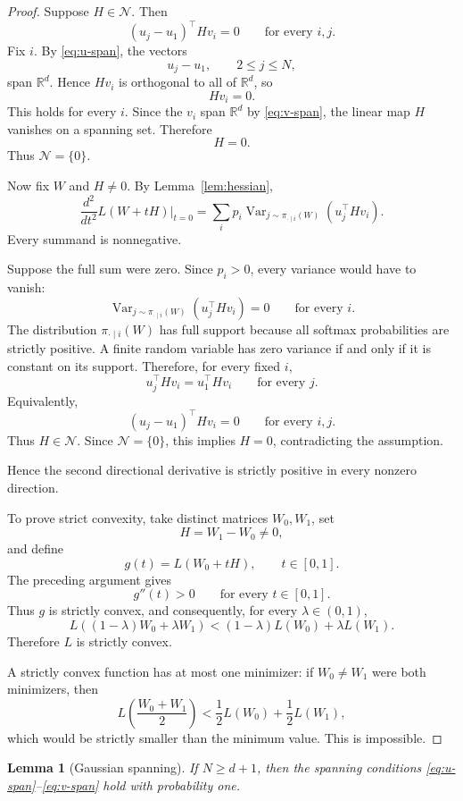 \documentclass[11pt]{article}
\newtheorem{lemma}[theorem]{Lemma}
\newcommand{\R}{\mathbb{R}}
\newcommand{\cN}{\mathcal{N}}
\newcommand{\1}{\mathbf{1}}
\newcommand{\Var}{\operatorname{Var}}
\begin{document}
\begin{proof}
Suppose \(H\in\cN\). Then
\[
(u_j-u_1)^\top Hv_i=0
\qquad
\text{for every }i,j.
\]
Fix \(i\). By \eqref{eq:u-span}, the vectors
\[
u_j-u_1,\qquad 2\le j\le N,
\]
span \(\R^d\). Hence \(Hv_i\) is orthogonal to all of \(\R^d\), so
\[
Hv_i=0.
\]
This holds for every \(i\). Since the \(v_i\) span \(\R^d\) by
\eqref{eq:v-span}, the linear map \(H\) vanishes on a spanning set.
Therefore
\[
H=0.
\]
Thus \(\cN=\{0\}\).

Now fix \(W\) and \(H\neq 0\). By Lemma~\ref{lem:hessian},
\[
\frac{d^2}{dt^2}L(W+tH)\bigg|_{t=0}
=
\sum_i p_i
\Var_{j\sim\pi_{\cdot\mid i}(W)}
\left(
u_j^\top Hv_i
\right).
\]
Every summand is nonnegative.

Suppose the full sum were zero. Since \(p_i>0\), every variance would
have to vanish:
\[
\Var_{j\sim\pi_{\cdot\mid i}(W)}
\left(
u_j^\top Hv_i
\right)
=
0
\qquad
\text{for every }i.
\]
The distribution \(\pi_{\cdot\mid i}(W)\) has full support because all
softmax probabilities are strictly positive. A finite random variable
has zero variance if and only if it is constant on its support.
Therefore, for every fixed \(i\),
\[
u_j^\top Hv_i
=
u_1^\top Hv_i
\qquad
\text{for every }j.
\]
Equivalently,
\[
(u_j-u_1)^\top Hv_i=0
\qquad
\text{for every }i,j.
\]
Thus \(H\in\cN\). Since \(\cN=\{0\}\), this implies \(H=0\), contradicting
the assumption.

Hence the second directional derivative is strictly positive in every
nonzero direction.

To prove strict convexity, take distinct matrices \(W_0,W_1\), set
\[
H=W_1-W_0\neq 0,
\]
and define
\[
g(t)=L(W_0+tH),
\qquad
t\in[0,1].
\]
The preceding argument gives
\[
g''(t)>0
\qquad
\text{for every }t\in[0,1].
\]
Thus \(g\) is strictly convex, and consequently, for every
\(\lambda\in(0,1)\),
\[
L((1-\lambda)W_0+\lambda W_1)
<
(1-\lambda)L(W_0)+\lambda L(W_1).
\]
Therefore \(L\) is strictly convex.

A strictly convex function has at most one minimizer: if \(W_0\neq W_1\)
were both minimizers, then
\[
L\left(\frac{W_0+W_1}{2}\right)
<
\frac12L(W_0)+\frac12L(W_1),
\]
which would be strictly smaller than the minimum value. This is
impossible.
\end{proof}

\begin{lemma}[Gaussian spanning]
\label{lem:gaussian-spanning}
If \(N\ge d+1\), then the spanning conditions
\eqref{eq:u-span}--\eqref{eq:v-span} hold with probability one.
\end{lemma}
\end{document}
